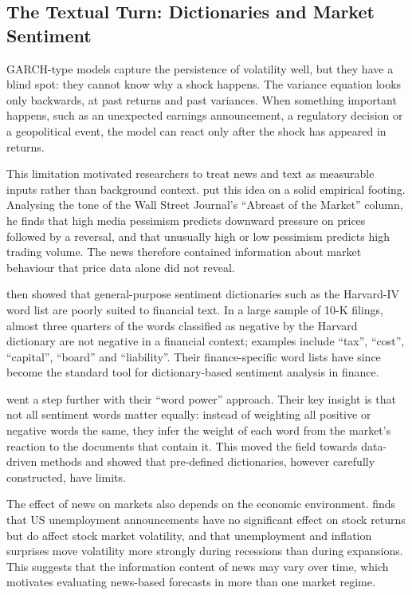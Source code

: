 \subsection{The Textual Turn: Dictionaries and Market Sentiment}\label{sec:lit-text}
GARCH-type models capture the persistence of volatility well, but they have a blind spot: they cannot know why a shock happens. The variance equation looks only backwards, at past returns and past variances. When something important happens, such as an unexpected earnings announcement, a regulatory decision or a geopolitical event, the model can react only after the shock has appeared in returns.

This limitation motivated researchers to treat news and text as measurable inputs rather than background context. \textcite{tetlock2007} put this idea on a solid empirical footing. Analysing the tone of the Wall Street Journal's ``Abreast of the Market'' column, he finds that high media pessimism predicts downward pressure on prices followed by a reversal, and that unusually high or low pessimism predicts high trading volume. The news therefore contained information about market behaviour that price data alone did not reveal.

\textcite{loughran2011} then showed that general-purpose sentiment dictionaries such as the Harvard-IV word list are poorly suited to financial text. In a large sample of 10-K filings, almost three quarters of the words classified as negative by the Harvard dictionary are not negative in a financial context; examples include ``tax'', ``cost'', ``capital'', ``board'' and ``liability''. Their finance-specific word lists have since become the standard tool for dictionary-based sentiment analysis in finance.

\textcite{jegadeesh2013} went a step further with their ``word power'' approach. Their key insight is that not all sentiment words matter equally: instead of weighting all positive or negative words the same, they infer the weight of each word from the market's reaction to the documents that contain it. This moved the field towards data-driven methods and showed that pre-defined dictionaries, however carefully constructed, have limits.

The effect of news on markets also depends on the economic environment. \textcite{cakan2012} finds that US unemployment announcements have no significant effect on stock returns but do affect stock market volatility, and that unemployment and inflation surprises move volatility more strongly during recessions than during expansions. This suggests that the information content of news may vary over time, which motivates evaluating news-based forecasts in more than one market regime.


